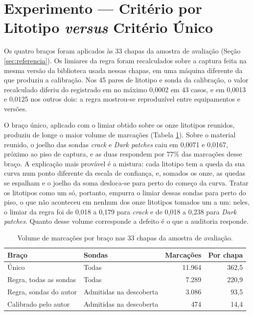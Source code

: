 \section{Experimento --- Critério por Litotipo \textit{versus} Critério Único}
\label{sec:res_exp1}

Os quatro braços foram aplicados às 33 chapas da amostra de avaliação (Seção \ref{sec:referencia}). Os limiares da regra foram recalculados sobre a captura feita na mesma versão da biblioteca usada nessas chapas, em uma máquina diferente da que produziu a calibração. Nos 45 pares de litotipo e sonda da calibração, o valor recalculado diferiu do registrado em no máximo 0,0002 em 43 casos, e em 0,0013 e 0,0125 nos outros dois: a regra mostrou-se reproduzível entre equipamentos e versões.

O braço único, aplicado com o limiar obtido sobre os onze litotipos reunidos, produziu de longe o maior volume de marcações (Tabela \ref{tab:exp1_volume}). Sobre o material reunido, o joelho das sondas \textit{crack} e \textit{Dark patches} caiu em 0,0071 e 0,0167, próximo ao piso de captura, e as duas respondem por 77\% das marcações desse braço. A explicação mais provável é a mistura: cada litotipo tem a queda da sua curva num ponto diferente da escala de confiança, e, somados os onze, as quedas se espalham e o joelho da soma desloca-se para perto do começo da curva. Tratar os litotipos como um só, portanto, empurra o limiar dessas sondas para perto do piso, o que não aconteceu em nenhum dos onze litotipos tomados um a um: neles, o limiar da regra foi de 0,018 a 0,179 para \textit{crack} e de 0,018 a 0,238 para \textit{Dark patches}. Quanto desse volume corresponde a defeito é o que a auditoria responde.

\begin{table}[ht]
  \caption{Volume de marcações por braço nas 33 chapas da amostra de avaliação.}
  \label{tab:exp1_volume}
  \centering
  \begin{tabular}{llrr}
    \hline
    \bfseries Braço & \bfseries Sondas & \bfseries Marcações & \bfseries Por chapa \\
    \hline
    Único                  & Todas                   & 11.964 & 362,5 \\
    Regra, todas as sondas & Todas                   &  7.289 & 220,9 \\
    Regra, sondas do autor & Admitidas na descoberta &  3.086 &  93,5 \\
    Calibrado pelo autor   & Admitidas na descoberta &    474 &  14,4 \\
    \hline
  \end{tabular}
\end{table}

